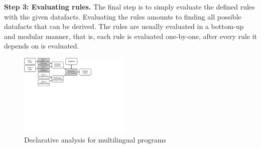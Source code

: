 




\medskip
\textbf{Step 3: Evaluating rules.}
The final step is to simply evaluate the defined rules with the given datafacts.
Evaluating the rules amounts to finding all possible
datafacts that can be derived. The rules are usually evaluated in a bottom-up
and modular manner, that is, each rule is evaluated one-by-one, after every
rule it depends on is evaluated.

\begin{figure}[t]
  \centering
  \vspace{2mm}
  \includegraphics[width=0.47\textwidth]{img/overview2}
  \caption{Declarative analysis for multilingual programs}
  \label{fig:overview2}
\end{figure}


